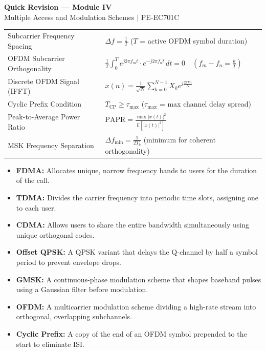 \documentclass[12pt,a4paper]{article}
\renewcommand{\arraystretch}{1.45}
\begin{document}
\newpage
\begin{center}
  {\large\bfseries\color{myred} Quick Revision --- Module IV}\\[3pt]
  {\small\color{mydark} Multiple Access and Modulation Schemes $|$ PE-EC701C}
\end{center}
\noindent{\color{myred}\rule{\linewidth}{1.2pt}}
\vspace{4pt}

\begin{tcolorbox}[formulabox, title={\textbf{Key Formulas at a Glance}}]
\renewcommand{\arraystretch}{1.3}
\begin{tabularx}{\linewidth}{B{5.5cm} X}Subcarrier Frequency Spacing & $\Delta f = \frac{1}{T}$ \quad ($T$ = active OFDM symbol duration) \\
OFDM Subcarrier Orthogonality & $\frac{1}{T}\int_{0}^{T} e^{j 2\pi f_m t} \cdot e^{-j 2\pi f_n t} \, dt = 0 \quad (f_m - f_n = \frac{k}{T})$ \\
Discrete OFDM Signal (IFFT) & $x(n) = \frac{1}{\sqrt{N}} \sum_{k=0}^{N-1} X_k e^{j \frac{2\pi k n}{N}}$ \\
Cyclic Prefix Condition & $T_{\text{CP}} \ge \tau_{\text{max}}$ \quad ($\tau_{\text{max}}$ = max channel delay spread) \\
Peak-to-Average Power Ratio & $\text{PAPR} = \frac{\max |x(t)|^2}{\mathbb{E}[|x(t)|^2]}$ \\
MSK Frequency Separation & $\Delta f_{\text{min}} = \frac{1}{2T_b}$ \quad (minimum for coherent orthogonality)
\end{tabularx}
\end{tcolorbox}

\begin{tcolorbox}[defbox, title={\textbf{One-Line Definitions}}]
\begin{itemize}[leftmargin=*, itemsep=2.5pt, topsep=0pt]
  \item \textbf{FDMA:} Allocates unique, narrow frequency bands to users for the duration of the call.
  \item \textbf{TDMA:} Divides the carrier frequency into periodic time slots, assigning one to each user.
  \item \textbf{CDMA:} Allows users to share the entire bandwidth simultaneously using unique orthogonal codes.
  \item \textbf{Offset QPSK:} A QPSK variant that delays the Q-channel by half a symbol period to prevent envelope drops.
  \item \textbf{GMSK:} A continuous-phase modulation scheme that shapes baseband pulses using a Gaussian filter before modulation.
  \item \textbf{OFDM:} A multicarrier modulation scheme dividing a high-rate stream into orthogonal, overlapping subchannels.
  \item \textbf{Cyclic Prefix:} A copy of the end of an OFDM symbol prepended to the start to eliminate ISI.
\end{itemize}
\end{tcolorbox}
\end{document}
